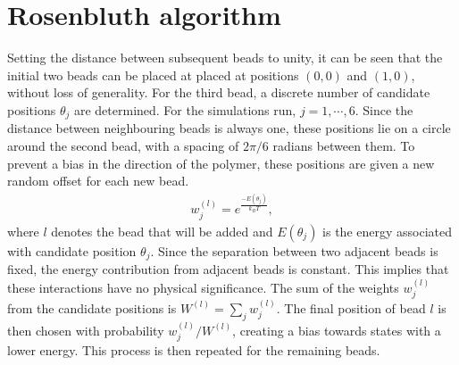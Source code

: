 \section{Rosenbluth algorithm}
Setting the distance between subsequent beads to unity, it can be seen that the initial two beads can be placed at placed at positions $(0,0)$ and $(1,0)$, without loss of generality. For the third bead, a discrete number of candidate positions $\theta_j$ are determined. For the simulations run, $j=1,\cdots,6$. Since the distance between neighbouring beads is always one, these positions lie on a circle around the second bead, with a spacing of $2\pi/6$ radians between them. To prevent a bias in the direction of the polymer, these positions are given a new random offset for each new bead.
\begin{gather}
    w_j^{(l)} = e^\frac{-E(\theta_j)}{k_BT},
\end{gather} where $l$ denotes the bead that will be added and $E(\theta_j)$ is the energy associated with candidate position $\theta_j$. Since the separation between two adjacent beads is fixed, the energy contribution from adjacent beads is constant. This implies that these interactions have no physical significance. The sum of the weights $w_j^{(l)}$ from the candidate positions is $W^{(l)} = \sum_j w_j^{(l)}$. The final position of bead $l$ is then chosen with probability $w_j^{(l)}/W^{(l)}$, creating a bias towards states with a lower energy. This process is then repeated for the remaining beads.
